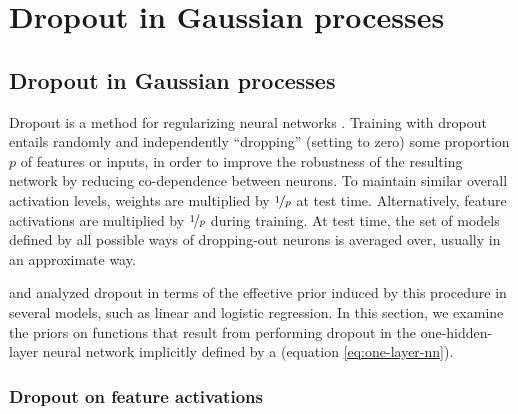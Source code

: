 
\inbpdocument



\chapter{Dropout in Gaussian processes}
\label{ch:additive}





\section{Dropout in Gaussian processes}



Dropout is a method for regularizing neural networks \citep{hinton2012improving, srivastava2013improving}.
Training with dropout entails randomly and independently ``dropping'' (setting to zero) some proportion $p$ of features or inputs, in order to improve the robustness of the resulting network by reducing co-dependence between neurons.
To maintain similar overall activation levels, weights are multiplied by $\nicefrac{1}{p}$ at test time. Alternatively, feature activations are multiplied by $\nicefrac{1}{p}$ during training.
At test time, the set of models defined by all possible ways of dropping-out neurons is averaged over, usually in an approximate way.

\citet{baldi2013understanding} and \citet{wang2013fast} analyzed dropout in terms of the effective prior induced by this procedure in several models, such as linear and logistic regression.
In this section, we examine the priors on functions that result from performing dropout in the one-hidden-layer neural network implicitly defined by a \gp{} (equation \eqref{eq:one-layer-nn}).


\subsection{Dropout on feature activations}

